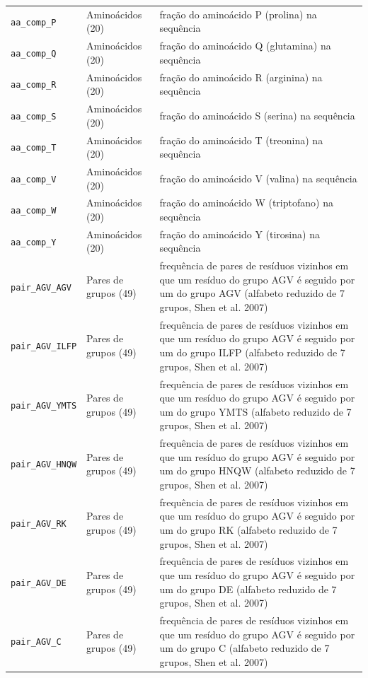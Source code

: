 \begin{longtable}{p{4.2cm}p{2.6cm}p{8cm}}
  \texttt{aa\_comp\_P} & Aminoácidos (20) & fração do aminoácido P (prolina) na sequência \\
  \texttt{aa\_comp\_Q} & Aminoácidos (20) & fração do aminoácido Q (glutamina) na sequência \\
  \texttt{aa\_comp\_R} & Aminoácidos (20) & fração do aminoácido R (arginina) na sequência \\
  \texttt{aa\_comp\_S} & Aminoácidos (20) & fração do aminoácido S (serina) na sequência \\
  \texttt{aa\_comp\_T} & Aminoácidos (20) & fração do aminoácido T (treonina) na sequência \\
  \texttt{aa\_comp\_V} & Aminoácidos (20) & fração do aminoácido V (valina) na sequência \\
  \texttt{aa\_comp\_W} & Aminoácidos (20) & fração do aminoácido W (triptofano) na sequência \\
  \texttt{aa\_comp\_Y} & Aminoácidos (20) & fração do aminoácido Y (tirosina) na sequência \\
  \texttt{pair\_AGV\_AGV} & Pares de grupos (49) & frequência de pares de resíduos vizinhos em que um resíduo do grupo {AGV} é seguido por um do grupo {AGV} (alfabeto reduzido de 7 grupos, Shen et al. 2007) \\
  \texttt{pair\_AGV\_ILFP} & Pares de grupos (49) & frequência de pares de resíduos vizinhos em que um resíduo do grupo {AGV} é seguido por um do grupo {ILFP} (alfabeto reduzido de 7 grupos, Shen et al. 2007) \\
  \texttt{pair\_AGV\_YMTS} & Pares de grupos (49) & frequência de pares de resíduos vizinhos em que um resíduo do grupo {AGV} é seguido por um do grupo {YMTS} (alfabeto reduzido de 7 grupos, Shen et al. 2007) \\
  \texttt{pair\_AGV\_HNQW} & Pares de grupos (49) & frequência de pares de resíduos vizinhos em que um resíduo do grupo {AGV} é seguido por um do grupo {HNQW} (alfabeto reduzido de 7 grupos, Shen et al. 2007) \\
  \texttt{pair\_AGV\_RK} & Pares de grupos (49) & frequência de pares de resíduos vizinhos em que um resíduo do grupo {AGV} é seguido por um do grupo {RK} (alfabeto reduzido de 7 grupos, Shen et al. 2007) \\
  \texttt{pair\_AGV\_DE} & Pares de grupos (49) & frequência de pares de resíduos vizinhos em que um resíduo do grupo {AGV} é seguido por um do grupo {DE} (alfabeto reduzido de 7 grupos, Shen et al. 2007) \\
  \texttt{pair\_AGV\_C} & Pares de grupos (49) & frequência de pares de resíduos vizinhos em que um resíduo do grupo {AGV} é seguido por um do grupo {C} (alfabeto reduzido de 7 grupos, Shen et al. 2007) \\

\end{longtable}
